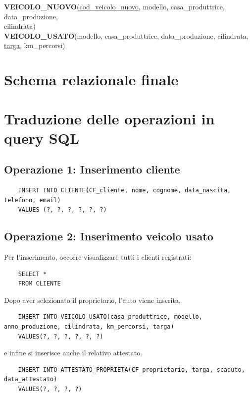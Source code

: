 \documentclass[a4paper,12pt]{report}
\begin{document}
\noindent
\textbf{VEICOLO\_NUOVO}(\underline{cod\_veicolo\_nuovo}, modello, casa\_produttrice, data\_produzione,\\
cilindrata)\\

\noindent
\textbf{VEICOLO\_USATO}(modello, casa\_produttrice, data\_produzione, cilindrata, \underline{targa}, km\_percorsi)\\

\section{Schema relazionale finale}

\section{Traduzione delle operazioni in query SQL}

\subsection*{Operazione 1: Inserimento cliente}
\begin{lstlisting}
	INSERT INTO CLIENTE(CF_cliente, nome, cognome, data_nascita, telefono, email) 
	VALUES (?, ?, ?, ?, ?, ?)
\end{lstlisting}

\subsection*{Operazione 2: Inserimento veicolo usato}
Per l'inserimento, occorre visualizzare tutti i clienti registrati:
\begin{lstlisting}
	SELECT * 
	FROM CLIENTE
\end{lstlisting}
Dopo aver selezionato il proprietario, l'auto viene inserita,
\begin{lstlisting}
	INSERT INTO VEICOLO_USATO(casa_produttrice, modello, anno_produzione, cilindrata, km_percorsi, targa) 
	VALUES(?, ?, ?, ?, ?, ?)
\end{lstlisting}
e infine si inserisce anche il relativo attestato.
\begin{lstlisting}
	INSERT INTO ATTESTATO_PROPRIETA(CF_proprietario, targa, scaduto, data_attestato) 
	VALUES(?, ?, ?, ?)
\end{lstlisting}
\end{document}
